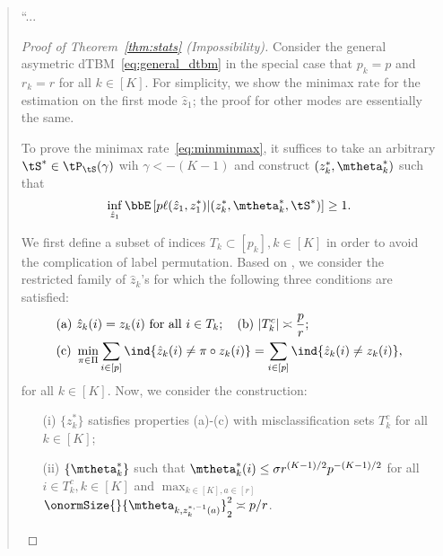 \documentclass[11pt]{article}
\theoremstyle{definition}
\theoremstyle{definition}
\begin{document}
\begin{enumerate}
\begin{enumerate}[wide]
    \begin{quote}
    ``...
        \begin{proof}[Proof of Theorem~\ref{thm:stats} (Impossibility)]Consider the general asymetric dTBM~\eqref{eq:general_dtbm} in the special case that $p_k = p$ and $r_k = r$ for all $ k\in [K]$. For simplicity, we show the minimax rate for the estimation on the first mode $\hat z_1$; the proof for other modes are essentially the same. 
   
   To prove the minimax rate~\eqref{eq:minminmax}, it suffices to take an arbitrary $\tS^* \in  \tP_{\tS}(\gamma)$ wih $\gamma < -(K-1)$ and construct $(z^*_k, \mtheta^*_k)$ such that 
   \begin{equation}
       \inf_{\hat z_1} \bbE \left[ p\ell(\hat z_1, z_1^*) | (z^*_k, \mtheta^*_k, \tS^*)  \right]\geq 1.
   \end{equation}
   
   We first define a subset of indices $T_k \subset [p_k], k \in [K]$ in order to avoid the complication of label permutation. Based on \citet[Proof of Theorem 6]{han2020exact}, we consider the restricted family of $\hat z_k$'s for which the following three conditions are satisfied:
   \begin{align}
       &\text{(a)}\ \hat z_k(i)=z_k(i) \text{ for all }i\in T_k; \quad \text{(b)} \ |T^c_k|\asymp {p\over r}; \\
       &\text{(c)}\ \min_{\pi\in \Pi}\sum_{i\in[p]}\ind\{\hat z_k(i) \neq \pi\circ z_k (i)\} = \sum_{i\in[p]}\ind\{\hat z_k(i) \neq  z_k (i)\},
   \end{align}
for all $k \in [K]$.
   Now, we consider the construction:
   \begin{enumerate}
       \item[(i)] $\{z_k^*\}$ satisfies properties (a)-(c) with misclassification sets $T_k^c$ for all $k \in [K]$;
       \item [(ii)] $\{\mtheta_k^*\}$ such that $\mtheta_k^*(i) \leq \sigma r^{(K-1)/2} p^{-(K-1)/2}$ for all $i \in T_k^c, k \in [K]$ and $\max_{k \in [K], a \in [r]} $ $\onormSize{}{\mtheta_{k, z^{*, -1}_k(a)}}^2_2 \asymp p/r$.
   \end{enumerate}
   

\end{proof}
\end{quote}
\end{enumerate}
\end{enumerate}
\end{document}
